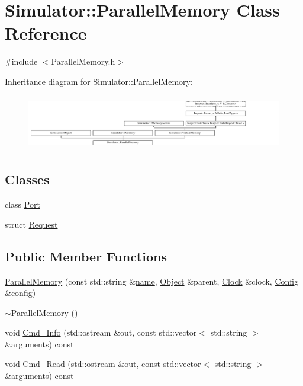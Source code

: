 \hypertarget{class_simulator_1_1_parallel_memory}{\section{Simulator\+:\+:Parallel\+Memory Class Reference}
\label{class_simulator_1_1_parallel_memory}
}


{\ttfamily \#include $<$Parallel\+Memory.\+h$>$}

Inheritance diagram for Simulator\+:\+:Parallel\+Memory\+:\begin{figure}[H]
\begin{center}
\leavevmode
\includegraphics[height=2.456140cm]{class_simulator_1_1_parallel_memory}
\end{center}
\end{figure}
\subsection*{Classes}
\begin{DoxyCompactItemize}
\item 
class \hyperlink{class_simulator_1_1_parallel_memory_1_1_port}{Port}
\item 
struct \hyperlink{struct_simulator_1_1_parallel_memory_1_1_request}{Request}
\end{DoxyCompactItemize}
\subsection*{Public Member Functions}
\begin{DoxyCompactItemize}
\item 
\hyperlink{class_simulator_1_1_parallel_memory_aa7b1be999267858296db77fa9fe18047}{Parallel\+Memory} (const std\+::string \&\hyperlink{mtconf_8c_a8f8f80d37794cde9472343e4487ba3eb}{name}, \hyperlink{class_simulator_1_1_object}{Object} \&parent, \hyperlink{class_simulator_1_1_clock}{Clock} \&clock, \hyperlink{class_config}{Config} \&config)
\item 
\hyperlink{class_simulator_1_1_parallel_memory_aff55eade2a79a39e47f4d937a55da2ec}{$\sim$\+Parallel\+Memory} ()
\item 
void \hyperlink{class_simulator_1_1_parallel_memory_adb96cb1031fd1435588edebd2aea8f00}{Cmd\+\_\+\+Info} (std\+::ostream \&out, const std\+::vector$<$ std\+::string $>$ \&arguments) const 
\item 
void \hyperlink{class_simulator_1_1_parallel_memory_a579eb00a322f2babdc04f8546af860c8}{Cmd\+\_\+\+Read} (std\+::ostream \&out, const std\+::vector$<$ std\+::string $>$ \&arguments) const 
\end{DoxyCompactItemize}
